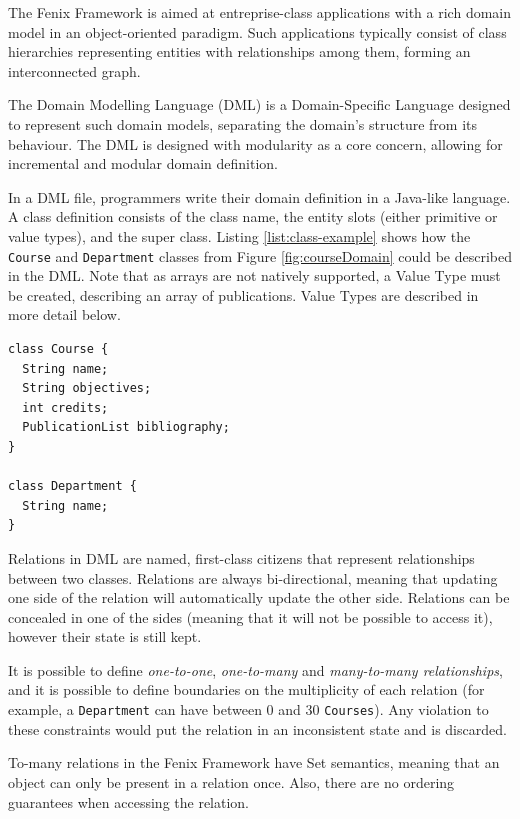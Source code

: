 \documentclass{llncs}
\begin{document}
The Fenix Framework is aimed at entreprise-class applications with a
rich domain model in an object-oriented paradigm. Such applications
typically consist of class hierarchies representing entities with
relationships among them, forming an interconnected graph. 

The Domain Modelling Language (DML) is a Domain-Specific Language
designed to represent such domain models, separating the domain's
structure from its behaviour. The DML is designed with modularity as a
core concern, allowing for incremental and modular domain definition.

In a DML file, programmers write their domain definition in a
Java-like language. A class definition consists of the class name, the
entity slots (either primitive or value types), and the super
class. Listing \ref{list:class-example} shows how the \texttt{Course}
and \texttt{Department} classes from Figure \ref{fig:courseDomain}
could be described in the DML. Note that as arrays are not natively
supported, a Value Type must be created, describing an array of
publications. Value Types are described in more detail below.

\begin{lstlisting}[caption={DML for the \texttt{Course} and 
  \texttt{Department} classes},
  label={list:class-example}, float]
class Course {
  String name;
  String objectives;
  int credits;
  PublicationList bibliography;
}

class Department {
  String name;
}
\end{lstlisting}

Relations in DML are named, first-class citizens that represent
relationships between two classes. Relations are always bi-directional,
meaning that updating one side of the relation will automatically
update the other side. Relations can be concealed in one of the sides
(meaning that it will not be possible to access it), however their
state is still kept.

It is possible to define {\it one-to-one}, {\it one-to-many} and {\it
  many-to-many relationships}, and it is possible to define boundaries
on the multiplicity of each relation (for example, a
\texttt{Department} can have between 0 and 30 \texttt{Courses}). Any
violation to these constraints would put the relation in an
inconsistent state and is discarded.

To-many relations in the Fenix Framework have Set semantics, meaning
that an object can only be present in a relation once. Also, there are
no ordering guarantees when accessing the relation.
\end{document}
